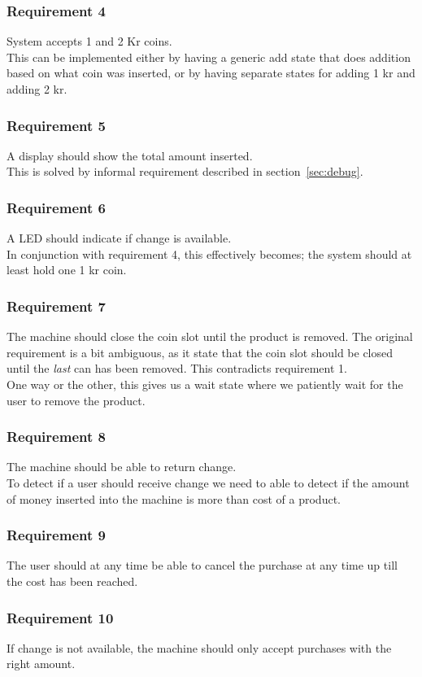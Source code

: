 \subsubsection*{Requirement 4}
System accepts 1 and 2 Kr coins.\\
This can be implemented either by having a generic add state that does addition based on what coin was inserted, or by having separate states for adding 1 kr and adding 2 kr.

\subsubsection*{Requirement 5}
A display should show the total amount inserted.\\
This is solved by informal requirement described in section~\ref{sec:debug}. 

\subsubsection*{Requirement 6}
A LED should indicate if change is available.\\
In conjunction with requirement 4, this effectively becomes; the system should at least hold one 1 kr coin. 

\subsubsection*{Requirement 7}
The machine should close the coin slot until the product is removed. The original requirement is a bit ambiguous, as it state that the coin slot should be closed until the \emph{last} can has been removed. This contradicts requirement 1.\\
One way or the other, this gives us a wait state where we patiently wait for the user to remove the product.

\subsubsection*{Requirement 8}
The machine should be able to return change.\\
To detect if a user should receive change we need to able to detect if the amount of money inserted into the machine is more than cost of a product.

\subsubsection*{Requirement 9}
The user should at any time be able to cancel the purchase at any time up till the cost has been reached.\\

\subsubsection*{Requirement 10}
If change is not available, the machine should only accept purchases with the right amount.